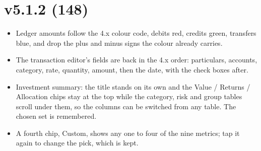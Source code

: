 \documentclass{article}
\begin{document}
    \section{v5.1.2 (148)}\label{sec:148}
    \begin{itemize}
        \item Ledger amounts follow the 4.x colour code, debits red, credits green, transfers blue, and drop the plus and minus signs the colour already carries.
        \item The transaction editor's fields are back in the 4.x order: particulars, accounts, category, rate, quantity, amount, then the date, with the check boxes after.
        \item Investment summary: the title stands on its own and the Value / Returns / Allocation chips stay at the top while the category, risk and group tables scroll under them, so the columns can be switched from any table. The chosen set is remembered.
        \item A fourth chip, Custom, shows any one to four of the nine metrics; tap it again to change the pick, which is kept.
    \end{itemize}
\end{document}
